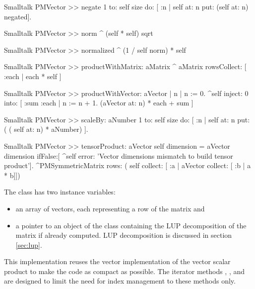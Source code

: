 \begin{displaycode}{Smalltalk}
PMVector >> negate
    1 to: self size do: [ :n | self at: n put: (self at: n) negated].
\end{displaycode}

\begin{displaycode}{Smalltalk}
PMVector >> norm
    ^ (self * self) sqrt
\end{displaycode}

\begin{displaycode}{Smalltalk}
PMVector >> normalized
    ^ (1 / self norm) * self
\end{displaycode}

\begin{displaycode}{Smalltalk}
PMVector >> productWithMatrix: aMatrix
    ^ aMatrix rowsCollect: [ :each | each * self ]
\end{displaycode}

\begin{displaycode}{Smalltalk}
PMVector >> productWithVector: aVector
    | n |
    n := 0.
    ^self inject: 0
            into: [ :sum :each | n := n + 1. (aVector at: n) * each + 
                                                                  sum ]
\end{displaycode}

\begin{displaycode}{Smalltalk}
PMVector >> scaleBy: aNumber
    1 to: self size do: [ :n | self at: n put: ( ( self at: n) * 
                                                            aNumber) ].
\end{displaycode}

\begin{displaycode}{Smalltalk}
PMVector >> tensorProduct: aVector
    self dimension = aVector dimension
        ifFalse:[ ^self error: 'Vector dimensions mismatch to build 
                                                     tensor product'].
    ^PMSymmetricMatrix rows: ( self collect: [ :a | aVector collect: 
                                                       [ :b | a * b]])
\end{displaycode}

\noindent The class  has two instance variables:
\begin{itemize}
\item {} an array of vectors, each representing a
row of the matrix and
\item {} a pointer to an object of the class  containing the LUP decomposition of the matrix if already computed.
LUP decomposition is discussed in
section \ref{sec:lup}.
\end{itemize}
This implementation reuses the vector implementation of the vector
scalar product to make the code as compact as possible.
The iterator methods , ,  and  are designed to limit the need for index management to these methods only.

